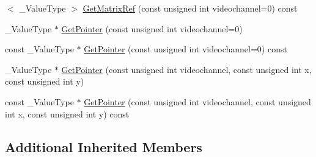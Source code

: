 \begin{DoxyCompactItemize}
$<$ \-\_\-\-Value\-Type $>$ \hyperlink{classsvl_sample_image_custom_a559be73b24375b8b76cf9a593f2d1deb}{Get\-Matrix\-Ref} (const unsigned int videochannel=0) const 
\item 
\-\_\-\-Value\-Type $\ast$ \hyperlink{classsvl_sample_image_custom_ae0038e62b12a4a336ffa8f47617adeac}{Get\-Pointer} (const unsigned int videochannel=0)
\item 
const \-\_\-\-Value\-Type $\ast$ \hyperlink{classsvl_sample_image_custom_aba8b7b88a35b6e0b2d53b2d83d949c50}{Get\-Pointer} (const unsigned int videochannel=0) const 
\item 
\-\_\-\-Value\-Type $\ast$ \hyperlink{classsvl_sample_image_custom_a51ca18480f3dc6996d51c189714238a2}{Get\-Pointer} (const unsigned int videochannel, const unsigned int x, const unsigned int y)
\item 
const \-\_\-\-Value\-Type $\ast$ \hyperlink{classsvl_sample_image_custom_a1df8a1a85ffee82f2d62a4406c786372}{Get\-Pointer} (const unsigned int videochannel, const unsigned int x, const unsigned int y) const 
\end{DoxyCompactItemize}
\subsection*{Additional Inherited Members}


